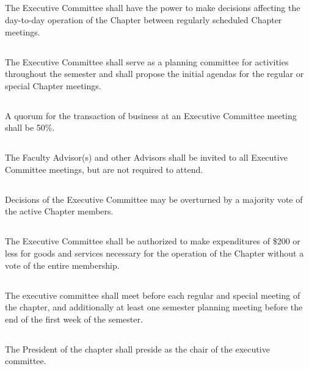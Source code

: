\documentclass[10pt, oneside]{article}
\begin{document}
\subsection{}
The Executive Committee shall have the power to make decisions affecting the day-to-day operation of the Chapter between regularly scheduled Chapter meetings.

\subsection{}
The Executive Committee shall serve as a planning committee for activities throughout the semester and shall propose the initial agendas for the regular or special Chapter meetings.

\subsection{}
A quorum for the transaction of business at an Executive Committee meeting shall be 50\%.

\subsection{}
The Faculty Advisor(s) and other Advisors shall be invited to all Executive Committee meetings, but are not required to attend.

\subsection{}
Decisions of the Executive Committee may be overturned by a majority vote of the active Chapter members.

\subsection{}
The Executive Committee shall be authorized to make expenditures of \$200 or less for goods and services necessary for the operation of the Chapter without a vote of the entire membership.

\subsection{}
The executive committee shall meet before each regular and special meeting of the chapter, and additionally at least one semester planning meeting before the end of the first week of the semester.

\subsection{}
The President of the chapter shall preside as the chair of the executive committee.
\end{document}
